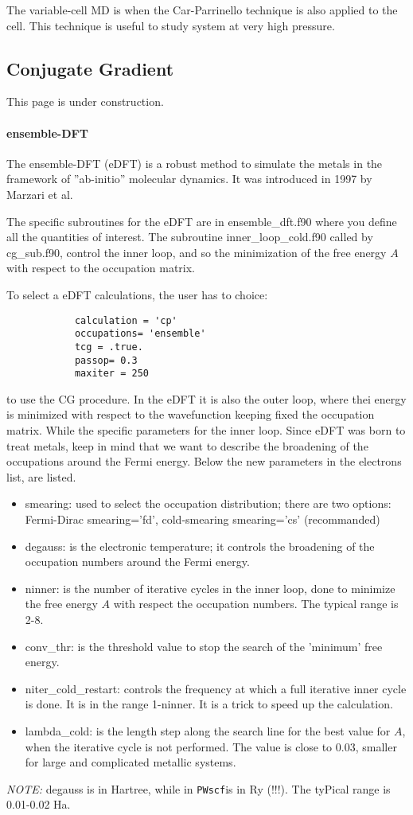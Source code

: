 \documentclass[12pt,a4paper]{article}
\def\PWscf{\texttt{PWscf}}
\begin{document}
The variable-cell MD is when the Car-Parrinello technique is also applied 
to the cell. This technique is useful to study system at very high pressure.

\subsection{ Conjugate Gradient }

This page is under construction.

\paragraph{ ensemble-DFT }

The ensemble-DFT (eDFT) is a robust method to simulate the metals in the 
framework of ''ab-initio'' molecular dynamics. It was introduced in 1997 
by Marzari et al.

The specific subroutines for the eDFT are in ensemble\_dft.f90 where you 
define all the quantities of interest. The subroutine inner\_loop\_cold.f90
called by cg\_sub.f90, control the inner loop, and so the minimization of 
the free energy $A$ with respect to the occupation matrix.

To select a eDFT calculations, the user has to choice:
\begin{verbatim}
            calculation = 'cp'
            occupations= 'ensemble' 
            tcg = .true.
            passop= 0.3
            maxiter = 250
\end{verbatim}
to use the CG procedure. In the eDFT it is also the outer loop, where thei
energy is minimized with respect to the wavefunction keeping fixed the 
occupation matrix. While the specific parameters for the inner loop.
Since eDFT was born to treat metals, keep in mind that we want to describe 
the broadening of the occupations around the Fermi energy.
Below the new parameters in the electrons list, are listed.
\begin{itemize}
\item smearing: used to select the occupation distribution;
there are two options: Fermi-Dirac smearing='fd', cold-smearing
smearing='cs' (recommanded) 
\item degauss: is the electronic temperature; it controls the broadening
of the occupation numbers around the Fermi energy. 
\item ninner: is the number of iterative cycles in the inner loop, 
done to minimize the free energy $A$ with respect the occupation numbers.
The typical range is 2-8.
\item conv\_thr: is the threshold value to stop the search of the 'minimum' 
free energy.
\item niter\_cold\_restart: controls the frequency at which a full iterative
inner cycle is done. It is in the range 1-ninner. It is a trick to speed up 
the calculation.
\item lambda\_cold: is the length step along the search line for the best 
value for $A$, when the iterative cycle is not performed. The value is close 
to 0.03, smaller for large and complicated metallic systems.
\end{itemize}
{\em NOTE:} degauss is in Hartree, while in \PWscf is in Ry (!!!). 
The tyPical range is 0.01-0.02 Ha.
\end{document}
